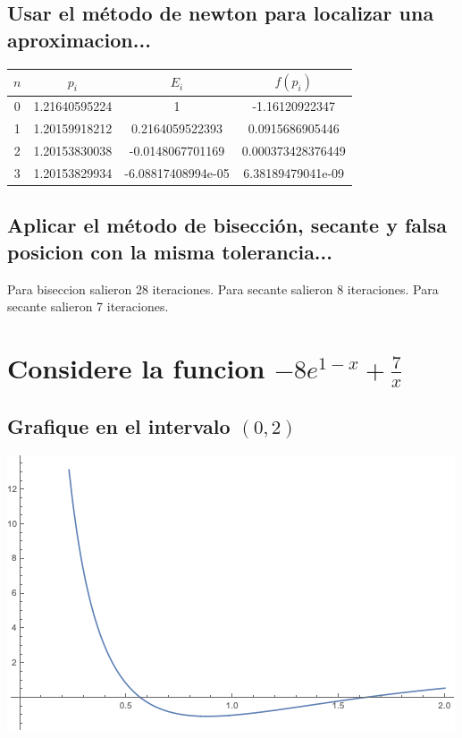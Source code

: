 \documentclass{article}
\begin{document}
\subsection{Usar el método de newton para localizar una aproximacion...}


\begin{center}
    \begin{tabular}{||c c c c||} 
    \hline
    $n$ & $p_{i}$ & $E_i$  & $ f(p_i)$ \\ [0.5ex] 
    \hline
    0 & 1.21640595224 & 1 & -1.16120922347 \\
    \hline
    1 & 1.20159918212 & 0.2164059522393 & 0.0915686905446 \\
    \hline
    2 & 1.20153830038 & -0.0148067701169 & 0.000373428376449 \\
    \hline
    3 & 1.20153829934 & -6.08817408994e-05 &  6.38189479041e-09 \\ [1ex]
    \hline

   \end{tabular}
\end{center}

\subsection{Aplicar el método de bisección, secante y falsa posicion con la misma tolerancia...}
Para biseccion salieron 28 iteraciones.
Para secante salieron 8 iteraciones.
Para secante salieron 7 iteraciones.

\section{Considere la funcion $-8e^{1-x} +\frac{7}{x}$}
\subsection{Grafique en el intervalo $(0,2)$}
\includegraphics[scale=0.75]{grafica2.png}
\end{document}
